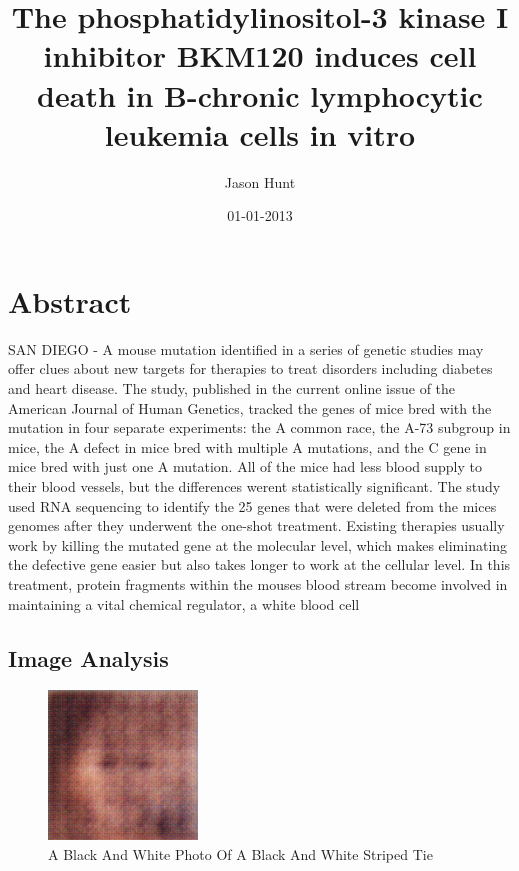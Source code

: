 \documentclass{article}%
\title{The phosphatidylinositol{-}3 kinase I inhibitor BKM120 induces cell death in B{-}chronic lymphocytic leukemia cells in vitro}%
\author{Jason Hunt}%
\affil{Department of Surgery, Gastroenterological Surgery, Graduate School of Medicine, Osaka University, Suita, Osaka, Japan}%
\date{01{-}01{-}2013}%
\begin{document}
%
\normalsize%
\maketitle%
\section{Abstract}%
\label{sec:Abstract}%
SAN DIEGO {-} A mouse mutation identified in a series of genetic studies may offer clues about new targets for therapies to treat disorders including diabetes and heart disease.\newline%
The study, published in the current online issue of the American Journal of Human Genetics, tracked the genes of mice bred with the mutation in four separate experiments: the A common race, the A{-}73 subgroup in mice, the A defect in mice bred with multiple A mutations, and the C gene in mice bred with just one A mutation. All of the mice had less blood supply to their blood vessels, but the differences werent statistically significant.\newline%
The study used RNA sequencing to identify the 25 genes that were deleted from the mices genomes after they underwent the one{-}shot treatment. Existing therapies usually work by killing the mutated gene at the molecular level, which makes eliminating the defective gene easier but also takes longer to work at the cellular level. In this treatment, protein fragments within the mouses blood stream become involved in maintaining a vital chemical regulator, a white blood cell

%
\subsection{Image Analysis}%
\label{subsec:ImageAnalysis}%


\begin{figure}[h!]%
\centering%
\includegraphics[width=150px]{500_fake_images/samples_5_130.png}%
\caption{A Black And White Photo Of A Black And White Striped Tie}%
\end{figure}

%
\end{document}
